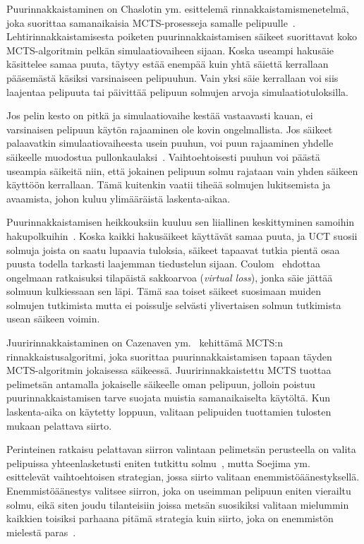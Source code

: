 \documentclass[12pt,finnish]{tktltiki2}
\theoremstyle{definition}
\theoremstyle{remark}
\begin{document}
Puurinnakkaistaminen on Chaslotin ym. esittelemä rinnakkaistamismenetelmä, joka suorittaa samanaikaisia MCTS-prosesseja samalle pelipuulle~\cite{chaslot}. Lehtirinnakkaistamisesta poiketen puurinnakkaistamisen säikeet suorittavat koko MCTS-algoritmin pelkän simulaatiovaiheen sijaan. Koska useampi hakusäie käsittelee samaa puuta, täytyy estää enempää kuin yhtä säiettä kerrallaan pääsemästä käsiksi varsinaiseen pelipuuhun. Vain yksi säie kerrallaan voi siis laajentaa pelipuuta tai päivittää pelipuun solmujen arvoja simulaatiotuloksilla.

Jos pelin kesto on pitkä ja simulaatiovaihe kestää vastaavasti kauan, ei varsinaisen pelipuun käytön rajaaminen ole kovin ongelmallista. Jos säikeet palaavatkin simulaatiovaiheesta usein puuhun, voi puun rajaaminen yhdelle säikeelle muodostua pullonkaulaksi~\cite{chaslot}. Vaihtoehtoisesti puuhun voi päästä useampia säikeitä niin, että jokainen pelipuun solmu rajataan vain yhden säikeen käyttöön kerrallaan. Tämä kuitenkin vaatii tiheää solmujen lukitsemista ja avaamista, johon kuluu ylimääräistä laskenta-aikaa.

Puurinnakkaistamisen heikkouksiin kuuluu sen liiallinen keskittyminen samoihin hakupolkuihin~\cite{browne, chaslot}. Koska kaikki hakusäikeet käyttävät samaa puuta, ja UCT suosii solmuja joista on saatu lupaavia tuloksia, säikeet tapaavat tutkia pientä osaa puusta todella tarkasti laajemman tiedustelun sijaan. Coulom~\cite{chaslot} ehdottaa ongelmaan ratkaisuksi tilapäistä sakkoarvoa (\textit{virtual loss}), jonka säie jättää solmuun kulkiessaan sen läpi. Tämä saa toiset säikeet suosimaan muiden solmujen tutkimista mutta ei poissulje selvästi ylivertaisen solmun tutkimista usean säikeen voimin.

Juuririnnakkaistaminen on Cazenaven ym.~\cite{cazenave} kehittämä MCTS:n rinnakkaistusalgoritmi, joka suorittaa puurinnakkaistamisen tapaan täyden MCTS-algoritmin jokaisessa säikeessä. Juuririnnakkaistettu MCTS tuottaa pelimetsän antamalla jokaiselle säikeelle oman pelipuun, jolloin poistuu puurinnakkaistamisen tarve suojata muistia samanaikaiselta käytöltä. Kun laskenta-aika on käytetty loppuun, valitaan pelipuiden tuottamien tulosten mukaan pelattava siirto.

Perinteinen ratkaisu pelattavan siirron valintaan pelimetsän perusteella on valita pelipuissa yhteenlasketusti eniten tutkittu solmu~\cite{browne}, mutta Soejima ym.~\cite{soejima} esittelevät vaihtoehtoisen strategian, jossa siirto valitaan enemmistöäänestyksellä. Enemmistöäänestys valitsee siirron, joka on useimman pelipuun eniten vierailtu solmu, eikä siten joudu tilanteisiin joissa metsän suosikiksi valitaan mielummin kaikkien toisiksi parhaana pitämä strategia kuin siirto, joka on enemmistön mielestä paras~\cite{soejima}.
\end{document}
